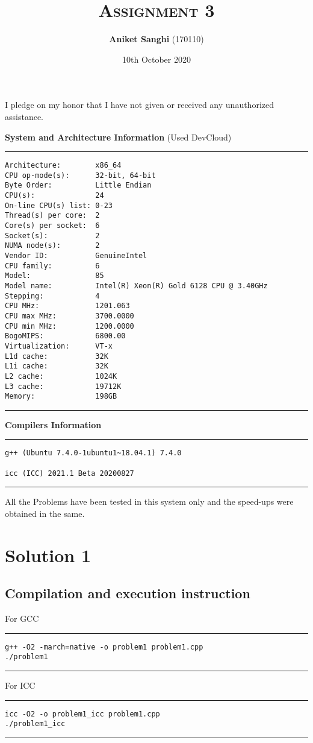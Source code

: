 \documentclass[a4paper]{article}
\title{\textsc{Assignment 3}}
\author{\textbf{Aniket Sanghi} (170110)}
\date{10th October 2020}
\begin{document}
\maketitle
\thispagestyle{fancy}
\fancyhead{}
\cfoot{\thepage}
\begin{center}
I pledge on my honor that I have not given or received any unauthorized assistance.\\
\end{center}
\vspace{1cm}
{\Large\bf System and Architecture Information } (Used DevCloud)
\vspace{0.5cm}
\hrule
\begin{lstlisting}
Architecture:        x86_64
CPU op-mode(s):      32-bit, 64-bit
Byte Order:          Little Endian
CPU(s):              24
On-line CPU(s) list: 0-23
Thread(s) per core:  2
Core(s) per socket:  6
Socket(s):           2
NUMA node(s):        2
Vendor ID:           GenuineIntel
CPU family:          6
Model:               85
Model name:          Intel(R) Xeon(R) Gold 6128 CPU @ 3.40GHz
Stepping:            4
CPU MHz:             1201.063
CPU max MHz:         3700.0000
CPU min MHz:         1200.0000
BogoMIPS:            6800.00
Virtualization:      VT-x
L1d cache:           32K
L1i cache:           32K
L2 cache:            1024K
L3 cache:            19712K
Memory:              198GB
\end{lstlisting}
\hrule 
\vspace{0.5cm}
{\Large\bf Compilers Information } 
\vspace{0.5cm}
\hrule
\begin{lstlisting}
g++ (Ubuntu 7.4.0-1ubuntu1~18.04.1) 7.4.0

icc (ICC) 2021.1 Beta 20200827
\end{lstlisting}
\hrule 
\vspace{1cm}
All the Problems have been tested in this system only and the speed-ups were obtained in the same.

\newpage

\section{\Huge Solution 1}
\vspace{0.5cm}
\subsection{Compilation and execution instruction }
\vspace{0.3cm}
For GCC
\vspace{0.2cm}
\hrule
\begin{lstlisting}
g++ -O2 -march=native -o problem1 problem1.cpp
./problem1
\end{lstlisting}
\hrule 
\vspace{0.3cm}
For ICC
\vspace{0.2cm}
\hrule
\begin{lstlisting}
icc -O2 -o problem1_icc problem1.cpp
./problem1_icc
\end{lstlisting}
\hrule 
\vspace{0.5cm}
\end{document}
